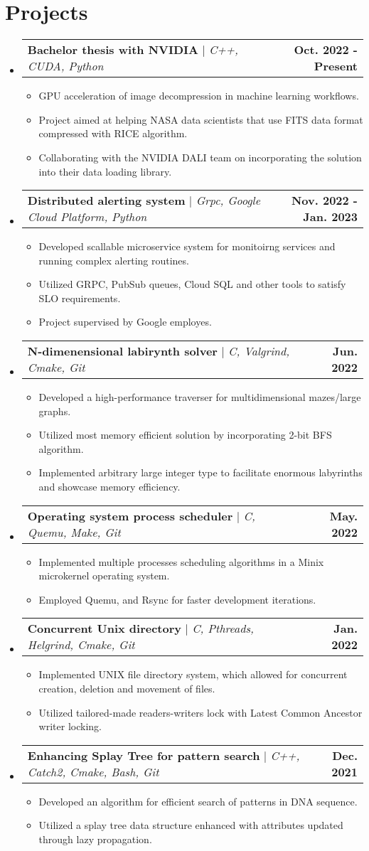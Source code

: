 \documentclass[letterpaper,11pt]{article}
\makeatletter
\newcommand{\resumeItem}[1]{
  \item\small{
    {#1 \vspace{-2pt}}
  }
}
\newcommand{\resumeProjectHeading}[2]{
    \item
    \begin{tabular*}{1.001\textwidth}{l@{\extracolsep{\fill}}r}
      \small#1 & \textbf{\small #2}\\
    \end{tabular*}\vspace{-7pt}
}
\newcommand{\resumeSubHeadingListStart}{\begin{itemize}[leftmargin=0.0in, label={}]}
\newcommand{\resumeSubHeadingListEnd}{\end{itemize}}
\newcommand{\resumeItemListStart}{\begin{itemize}}
\newcommand{\resumeItemListEnd}{\end{itemize}\vspace{-5pt}}
\makeatother
\begin{document}
\section{Projects}
\vspace{-5pt}
\resumeSubHeadingListStart
\resumeProjectHeading
{\textbf{Bachelor thesis with NVIDIA} $|$ \emph{C++, CUDA, Python}}{Oct. 2022 - Present}
\resumeItemListStart
\resumeItem{GPU acceleration of image decompression in machine learning workflows.}
\resumeItem{Project aimed at helping NASA data scientists that use FITS data format compressed with RICE algorithm.}
\resumeItem{Collaborating with the NVIDIA DALI team on incorporating the solution into their data loading library. }
\resumeItemListEnd
\vspace{-13pt}
\resumeProjectHeading
{\textbf{Distributed alerting system} $|$ \emph{Grpc, Google Cloud Platform, Python}}{Nov. 2022 - Jan. 2023}
\resumeItemListStart
\resumeItem{Developed scallable microservice system for monitoirng services and running complex alerting routines.}
\resumeItem{Utilized GRPC, PubSub queues, Cloud SQL and other tools to satisfy SLO requirements.}
\resumeItem{Project supervised by Google employes.}
\resumeItemListEnd
\vspace{-13pt}
\resumeProjectHeading
{\textbf{N-dimenensional labirynth solver} $|$ \emph{C, Valgrind, Cmake,  Git}}{Jun. 2022}
\resumeItemListStart
\resumeItem{Developed a high-performance traverser for multidimensional mazes/large graphs.}
\resumeItem{Utilized most memory efficient solution by incorporating 2-bit BFS algorithm.}
\resumeItem{Implemented arbitrary large integer type to facilitate enormous labyrinths and showcase memory efficiency.}
\resumeItemListEnd
\vspace{-13pt}
\resumeProjectHeading
{\textbf{Operating system process scheduler} $|$ \emph{C, Quemu, Make, Git}}{May. 2022}
\resumeItemListStart
\resumeItem{Implemented multiple processes scheduling algorithms in a Minix microkernel operating system.}
\resumeItem{Employed Quemu, and Rsync for faster development iterations.}
\resumeItemListEnd
\vspace{-13pt}
\resumeProjectHeading
{\textbf{Concurrent Unix directory} $|$ \emph{C, Pthreads, Helgrind, Cmake,  Git}}{Jan. 2022}
\resumeItemListStart
\resumeItem{Implemented UNIX file directory system, which allowed for concurrent creation, deletion and movement of files. }
\resumeItem{Utilized tailored-made readers-writers lock with Latest Common Ancestor writer locking.}
\resumeItemListEnd
\vspace{-13pt}
\resumeProjectHeading
{\textbf{Enhancing Splay Tree for pattern search} $|$ \emph{C++, Catch2, Cmake, Bash, Git}}{Dec. 2021}
\resumeItemListStart
\resumeItem{Developed an algorithm for efficient search of patterns in DNA sequence.}
\resumeItem{Utilized a splay tree data structure enhanced with attributes updated through lazy propagation.}
\resumeItemListEnd
\resumeSubHeadingListEnd
\vspace{-16pt}
\end{document}
